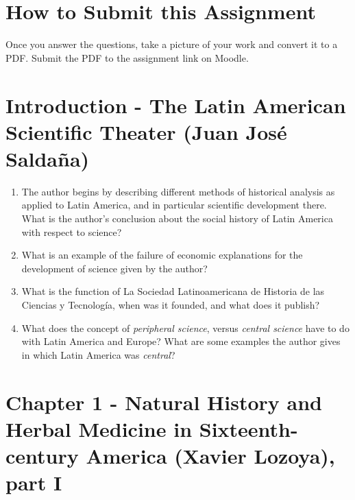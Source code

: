 \documentclass[10pt]{article}
\begin{document}
\maketitle

\section{How to Submit this Assignment}

Once you answer the questions, take a picture of your work and convert it to a PDF.  Submit the PDF to the assignment link on Moodle.

\section{Introduction - The Latin American Scientific Theater (Juan Jos\'{e} Salda\~{n}a)}

\begin{enumerate}
\item The author begins by describing different methods of historical analysis as applied to Latin America, and in particular scientific development there.  What is the author's conclusion about the social history of Latin America with respect to science? \\ \vspace{2cm}
\item What is an example of the failure of economic explanations for the development of science given by the author? \\ \vspace{2cm}
\item What is the function of La Sociedad Latinoamericana de Historia de las Ciencias y Tecnolog\'{i}a, when was it founded, and what does it publish? \\ \vspace{1cm}
\item What does the concept of \textit{peripheral science}, versus \textit{central science} have to do with Latin America and Europe?  What are some examples the author gives in which Latin America was \textit{central}? \\ \vspace{2cm}
\end{enumerate}

\section{Chapter 1 - Natural History and Herbal Medicine in Sixteenth-century America (Xavier Lozoya), part I}
\end{document}
